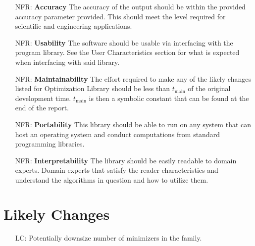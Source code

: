\documentclass[12pt]{article}
\newcounter{nfrnum} %
\newcounter{lcnum} %
\begin{document}
\noindent \begin{itemize}

\item[NFR\refstepcounter{nfrnum}\thenfrnum \label{NFR_Accuracy}:]
  \textbf{Accuracy} The accuracy of the output should be within the provided accuracy parameter provided. This should meet the level required for scientific and engineering applications. 
\item[NFR\refstepcounter{nfrnum}\thenfrnum \label{NFR_Usability}:] \textbf{Usability}
  The software should be usable via interfacing with the program library. See the User Characteristics section for what is expected when interfacing with said library. 

\item[NFR\refstepcounter{nfrnum}\thenfrnum \label{NFR_Maintainability}:]
  \textbf{Maintainability} The effort required to make any of the likely
    changes listed for Optimization Library should be less than $t_{\text{main}}$ of the original
    development time. $t_{\text{main}}$ is then a symbolic constant that can be found at the end of the report.

\item[NFR\refstepcounter{nfrnum}\thenfrnum \label{NFR_Portability}:]
  \textbf{Portability} This library should be able to run on any system that can host an operating system and conduct computations from standard programming libraries.

\item[NFR\refstepcounter{nfrnum}\thenfrnum \label{NFR_Interpretability}:]
  \textbf{Interpretability} The library should be easily readable to domain experts. Domain experts that satisfy the reader characteristics and understand the algorithms in question and how to utilize them.

\end{itemize}



\section{Likely Changes}    

\noindent \begin{itemize}

\item[LC\refstepcounter{lcnum}\thelcnum\label{LC_likely1}:] Potentially downsize number of minimizers in the family. 

\end{itemize}
\end{document}
